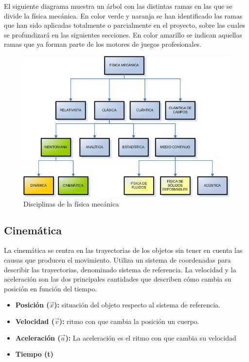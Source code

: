 El siguiente diagrama muestra un árbol con las distintas ramas en las que se divide la física mecánica. En color verde y naranja se han identificado las ramas que han sido aplicadas totalmente o parcialmente en el proyecto, sobre las cuales se profundizará en las siguientes secciones. En color amarillo se indican aquellas ramas que ya forman parte de los motores de juegos profesionales.

\begin{figure}[h]
	\centering	
         \includegraphics[width=12cm]{img/FisicaMecanica.jpg}
	\caption{Disciplinas de la física mecánica}
\end{figure}


\subsection{Cinemática} 

La cinemática se centra en las trayectorias de los objetos sin tener en cuenta las causas que producen el movimiento. Utiliza un sistema de coordenadas para describir las trayectorias, denominado sistema de referencia. La velocidad y la aceleración son las dos principales cantidades que describen cómo cambia su posición en función del tiempo.

\begin{itemize} 
\item \textbf{Posición ($\vec{x}$): } situación del objeto respecto al sistema de referencia.
\item \textbf{Velocidad ($\vec{v}$):}  ritmo con que cambia la posición un cuerpo.
\item \textbf{Aceleración ($\vec{a}$):} La aceleración es el ritmo con que cambia su velocidad
\item \textbf{Tiempo (t)} 
\end{itemize}

